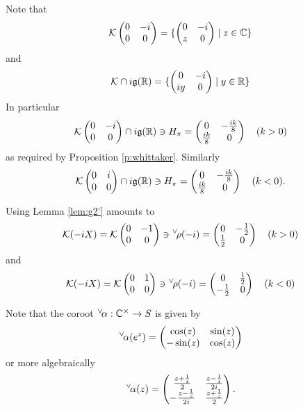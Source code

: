 \documentclass{article}
\theoremstyle{definition}
\numberwithin{equation}{section}
\renewcommand{\-}{\hyp{}}
\newcommand{\g}{\mathfrak g}
\newcommand{\K}{\mathcal K}
\newcommand{\ch}[1]{\negthinspace\negthinspace\negthinspace\phantom{a}^\vee\negthinspace #1}
\begin{document}
Note that
$$
\K
\begin{pmatrix}0&-i\\0&0
\end{pmatrix}=\{\begin{pmatrix}0&-i\\z&0
\end{pmatrix}\mid z\in\C\}
$$
and
$$
\K\cap i\g(\R)=
\{\begin{pmatrix}0&-i\\iy&0
\end{pmatrix}\mid y\in\R\}
$$
In particular
$$
\K\begin{pmatrix}0&-i\\0&0\end{pmatrix}\cap i\g(\R)\ni H_\pi=\begin{pmatrix}0&-\frac{ik}8\\\frac{ik}8&0\end{pmatrix}\quad (k>0)
$$
as required by Proposition \ref{p:whittaker}.
Similarly
$$
\K\begin{pmatrix}0&i\\0&0\end{pmatrix}\cap i\g(\R)\ni H_\pi=\begin{pmatrix}0&-\frac{ik}8\\\frac{ik}8&0\end{pmatrix}\quad (k<0).
$$

Using Lemma \ref{lem:g2'} amounts to 
$$
\K(-iX)=\K\begin{pmatrix}0&-1\\0&0
\end{pmatrix}\ni \ch\rho(-i)=
\begin{pmatrix}
  0&-\frac 12\\\frac 12&0
\end{pmatrix}\quad (k>0)
$$
and
$$
\K(-iX)=\K\begin{pmatrix}0&1\\0&0
\end{pmatrix}\ni \ch\rho(-i)=
\begin{pmatrix}
  0&\frac 12\\-\frac 12&0
\end{pmatrix}\quad (k<0)
$$

Note that the coroot $\ch\alpha:\C^\times \rightarrow S$ is given by
$$
\ch\alpha(e^z)=\begin{pmatrix}\cos(z)&\sin(z)\\-\sin(z)&\cos(z)
\end{pmatrix}
$$
or more algebraically
$$
\ch\alpha(z)=\begin{pmatrix}
\frac{z+\frac 1z}2&\frac{z-\frac 1z}{2i}\\
-\frac{z-\frac 1z}{2i}&\frac{z+\frac 1z}2
\end{pmatrix}.
$$
\end{document}
